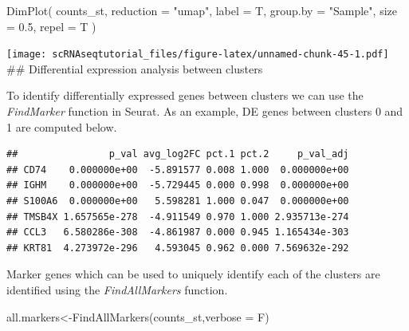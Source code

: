 \documentclass[
  openany]{book}
\newenvironment{Shaded}{\begin{snugshade}}{\end{snugshade}}
\newcommand{\AttributeTok}[1]{\textcolor[rgb]{0.77,0.63,0.00}{#1}}
\newcommand{\DecValTok}[1]{\textcolor[rgb]{0.00,0.00,0.81}{#1}}
\newcommand{\FloatTok}[1]{\textcolor[rgb]{0.00,0.00,0.81}{#1}}
\newcommand{\FunctionTok}[1]{\textcolor[rgb]{0.00,0.00,0.00}{#1}}
\newcommand{\NormalTok}[1]{#1}
\newcommand{\OtherTok}[1]{\textcolor[rgb]{0.56,0.35,0.01}{#1}}
\newcommand{\SpecialCharTok}[1]{\textcolor[rgb]{0.00,0.00,0.00}{#1}}
\newcommand{\StringTok}[1]{\textcolor[rgb]{0.31,0.60,0.02}{#1}}
\begin{document}
\begin{Shaded}
\begin{Highlighting}[]
\FunctionTok{DimPlot}\NormalTok{(}
\NormalTok{  counts\_st,}
  \AttributeTok{reduction =} \StringTok{"umap"}\NormalTok{,}
  \AttributeTok{label =}\NormalTok{ T,}
  \AttributeTok{group.by =} \StringTok{"Sample"}\NormalTok{,}
  \AttributeTok{size =} \FloatTok{0.5}\NormalTok{,}
  \AttributeTok{repel =}\NormalTok{ T}
\NormalTok{)}
\end{Highlighting}
\end{Shaded}

\texttt{[image: scRNAseqtutorial\_files/figure-latex/unnamed-chunk-45-1.pdf]}
\#\# Differential expression analysis between clusters

To identify differentially expressed genes between clusters we can use the \emph{FindMarker} function in Seurat. As an example, DE genes between clusters 0 and 1 are computed below.

\begin{Shaded}
\end{Shaded}

\begin{verbatim}
##                p_val avg_log2FC pct.1 pct.2     p_val_adj
## CD74    0.000000e+00  -5.891577 0.008 1.000  0.000000e+00
## IGHM    0.000000e+00  -5.729445 0.000 0.998  0.000000e+00
## S100A6  0.000000e+00   5.598281 1.000 0.047  0.000000e+00
## TMSB4X 1.657565e-278  -4.911549 0.970 1.000 2.935713e-274
## CCL3   6.580286e-308  -4.861987 0.000 0.945 1.165434e-303
## KRT81  4.273972e-296   4.593045 0.962 0.000 7.569632e-292
\end{verbatim}

Marker genes which can be used to uniquely identify each of the clusters are identified using the \emph{FindAllMarkers} function.

\begin{Shaded}
\begin{Highlighting}[]
\NormalTok{all.markers}\OtherTok{\textless{}{-}}\FunctionTok{FindAllMarkers}\NormalTok{(counts\_st,}\AttributeTok{verbose =}\NormalTok{ F)}
\end{Highlighting}
\end{Shaded}
\end{document}
